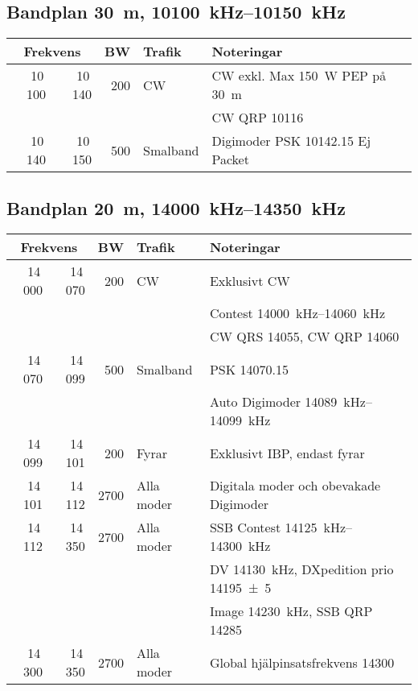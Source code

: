 \subsection{Bandplan \qty{30}{\metre}, \SIrange{10100}{10150}{\kilo\hertz}}
\begin{tabular}{rrrll}
\multicolumn{2}{c}{\textbf{Frekvens}} & \textbf{BW} & \textbf{Trafik} & \textbf{Noteringar} \\ \hline

10\,100 & 10\,140 & 200 & CW       & CW exkl. Max \qty{150}{\watt} PEP på \qty{30}{m} \\
        &         &     &          & CW QRP \num{10116}                     \\ \hline
10\,140 & 10\,150 & 500 & Smalband & Digimoder PSK \num{10142,15} Ej Packet \\
\end{tabular}

\subsection{Bandplan \qty{20}{\metre}, \SIrange{14000}{14350}{\kilo\hertz}}
\begin{tabular}{rrrll}
\multicolumn{2}{c}{\textbf{Frekvens}} & \textbf{BW} & \textbf{Trafik}
        & \textbf{Noteringar} \\ \hline

14\,000 & 14\,070 & 200  & CW         & Exklusivt CW                                        \\
        &         &      &            & Contest \SIrange{14000}{14060}{\kilo\hertz}                 \\
        &         &      &            & CW QRS \num{14055}, CW QRP \num{14060}              \\ \hline
14\,070 & 14\,099 & 500  & Smalband   & PSK \num{14070,15}                                  \\
        &         &      &            & Auto Digimoder \SIrange{14089}{14099}{\kilo\hertz}          \\ \hline
14\,099 & 14\,101 & 200  & Fyrar      & Exklusivt IBP, endast fyrar                         \\ \hline
14\,101 & 14\,112 & 2700 & Alla moder & Digitala moder och obevakade Digimoder              \\ \hline
14\,112 & 14\,350 & 2700 & Alla moder & SSB Contest \SIrange{14125}{14300}{\kilo\hertz}             \\
        &         &      &            & DV \qty{14130}{\kilo\hertz}, DXpedition prio \qty{14195(5)}{} \\ 
        &         &      &            & Image \qty{14230}{\kilo\hertz}, SSB QRP \num{14285}          \\ \hline
14\,300 & 14\,350 & 2700 & Alla moder & Global hjälpinsatsfrekvens \num{14300}              \\
\end{tabular}

